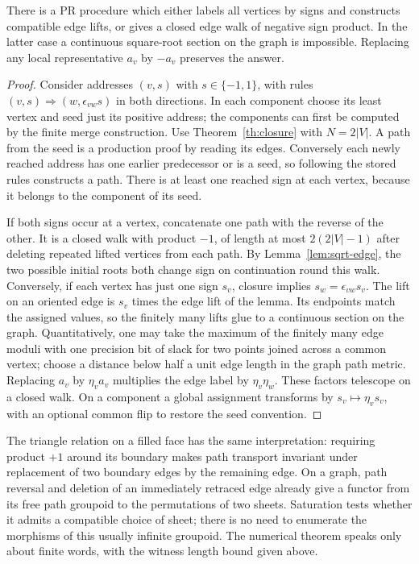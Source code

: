 \begin{theorem}\label{th:mon}
There is a PR procedure which either labels all vertices by signs and constructs compatible edge lifts, or gives a closed edge walk of negative sign product. In the latter case a continuous square-root section on the graph is impossible. Replacing any local representative $a_v$ by $-a_v$ preserves the answer.
\end{theorem}
\begin{proof}
Consider addresses $(v,s)$ with $s\in\{-1,1\}$, with rules $(v,s)\Rightarrow(w,\epsilon_{vw}s)$ in both directions. In each component choose its least vertex and seed just its positive address; the components can first be computed by the finite merge construction. Use Theorem~\ref{th:closure} with $N=2|V|$. A path from the seed is a production proof by reading its edges. Conversely each newly reached address has one earlier predecessor or is a seed, so following the stored rules constructs a path. There is at least one reached sign at each vertex, because it belongs to the component of its seed.

If both signs occur at a vertex, concatenate one path with the reverse of the other. It is a closed walk with product $-1$, of length at most $2(2|V|-1)$ after deleting repeated lifted vertices from each path. By Lemma~\ref{lem:sqrt-edge}, the two possible initial roots both change sign on continuation round this walk. Conversely, if each vertex has just one sign $s_v$, closure implies $s_w=\epsilon_{vw}s_v$. The lift on an oriented edge is $s_v$ times the edge lift of the lemma. Its endpoints match the assigned values, so the finitely many lifts glue to a continuous section on the graph. Quantitatively, one may take the maximum of the finitely many edge moduli with one precision bit of slack for two points joined across a common vertex; choose a distance below half a unit edge length in the graph path metric. Replacing $a_v$ by $\eta_v a_v$ multiplies the edge label by $\eta_v\eta_w$. These factors telescope on a closed walk. On a component a global assignment transforms by $s_v\mapsto\eta_v s_v$, with an optional common flip to restore the seed convention.
\end{proof}

The triangle relation on a filled face has the same interpretation: requiring product $+1$ around its boundary makes path transport invariant under replacement of two boundary edges by the remaining edge. On a graph, path reversal and deletion of an immediately retraced edge already give a functor from its free path groupoid to the permutations of two sheets. Saturation tests whether it admits a compatible choice of sheet; there is no need to enumerate the morphisms of this usually infinite groupoid. The numerical theorem speaks only about finite words, with the witness length bound given above.

